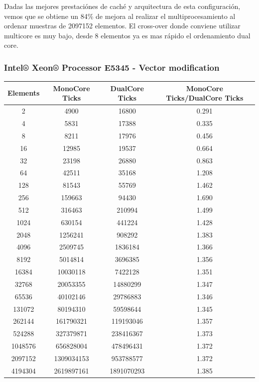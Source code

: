 	Dadas las mejores prestaciónes de caché y arquitectura de esta configuración, vemos que se obtiene un 84\% de mejora al realizar el multiprocesamiento al ordenar muestras de 2097152 elementos. El cross-over donde conviene utilizar multicore es muy bajo, desde 8 elementos ya es mas rápido el ordenamiento dual core. 

\subsubsection{Intel® Xeon® Processor E5345 - Vector modification}
\begin{center}
\begin{tabular}{|c|c|c|c|}
	\hline
		Elements & MonoCore Ticks & DualCore Ticks & MonoCore Ticks/DualCore Ticks\\
	\hline
		2 & 4900 & 16800 & 0.291\\
	\hline
		4 & 5831 & 17388 & 0.335\\
	\hline
		8 & 8211 & 17976 & 0.456\\
	\hline
		16 & 12985 & 19537 & 0.664\\
	\hline
		32 & 23198 & 26880 & 0.863\\
	\hline
		64 & 42511 & 35168 & 1.208\\
	\hline
		128 & 81543 & 55769 & 1.462\\
	\hline
		256 & 159663 & 94430 & 1.690\\
	\hline
		512 & 316463 & 210994 & 1.499\\
	\hline
		1024 & 630154 & 441224 & 1.428\\
	\hline
		2048 & 1256241 & 908292 & 1.383\\
	\hline
		4096 & 2509745 & 1836184 & 1.366\\
	\hline
		8192 & 5014814 & 3696385 & 1.356\\
	\hline
		16384 & 10030118 & 7422128 & 1.351\\
	\hline
		32768 & 20053355 & 14880299 & 1.347\\
	\hline
		65536 & 40102146 & 29786883 & 1.346\\
	\hline
		131072 & 80194310 & 59598644 & 1.345\\
	\hline
		262144 & 161790321 & 119193046 & 1.357\\
	\hline
		524288 & 327379871 & 238416367 & 1.373\\
	\hline
		1048576 & 656828004 & 478496431 & 1.372\\
	\hline
		2097152 & 1309034153 & 953788577 & 1.372\\
	\hline
		4194304 & 2619897161 & 1891070293 & 1.385\\
	\hline
\end{tabular}
\end{center}

